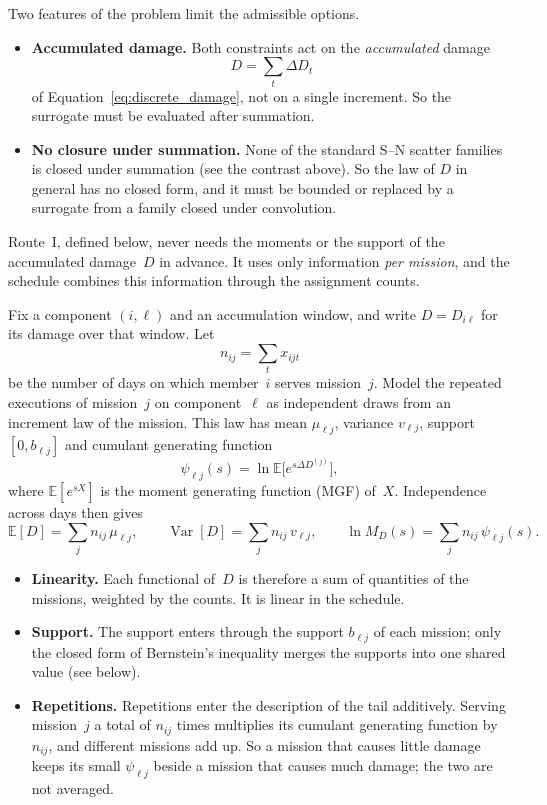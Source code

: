 \documentclass[11pt,a4paper]{article}
\theoremstyle{plain}
\theoremstyle{definition}
\theoremstyle{remark}
\begin{document}
Two features of the problem limit the admissible options.
\begin{itemize}
  \item \textbf{Accumulated damage.} Both constraints act on the \emph{accumulated} damage
    \begin{equation}
      D = \sum_t \Delta D_t
    \end{equation}
    of Equation~\eqref{eq:discrete_damage}, not on a single increment.
    So the surrogate must be evaluated after summation.
  \item \textbf{No closure under summation.} None of the standard S--N scatter families is closed under summation (see the contrast above).
    So the law of $D$ in general has no closed form, and it must be bounded or replaced by a surrogate from a family closed under convolution.
\end{itemize}

Route~I, defined below, never needs the moments or the support of the accumulated damage~$D$ in advance.
It uses only information \emph{per mission}, and the schedule combines this information through the assignment counts.

Fix a component $(i,\ell)$ and an accumulation window, and write $D = D_{i\ell}$ for its damage over that window.
Let
\begin{equation}
  n_{ij} = \sum_t x_{ijt}
\end{equation}
be the number of days on which member~$i$ serves mission~$j$.
Model the repeated executions of mission~$j$ on component~$\ell$ as independent draws from an increment law of the mission.
This law has mean $\mu_{\ell j}$, variance $v_{\ell j}$, support $[0,b_{\ell j}]$ and cumulant generating function
\begin{equation}
  \psi_{\ell j}(s) = \ln \mathbb{E}\big[e^{s\Delta D^{(j)}}\big],
\end{equation}
where $\mathbb{E}[e^{sX}]$ is the moment generating function (MGF) of~$X$.
Independence across days then gives
\begin{equation}\label{eq:additive_functionals}
  \mathbb{E}[D] = \sum_j n_{ij}\,\mu_{\ell j}, \qquad
  \operatorname{Var}[D] = \sum_j n_{ij}\,v_{\ell j}, \qquad
  \ln M_D(s) = \sum_j n_{ij}\,\psi_{\ell j}(s).
\end{equation}
\begin{itemize}
  \item \textbf{Linearity.} Each functional of~$D$ is therefore a sum of quantities of the missions, weighted by the counts.
    It is linear in the schedule.
  \item \textbf{Support.} The support enters through the support $b_{\ell j}$ of each mission; only the closed form of Bernstein's inequality merges the supports into one shared value (see below).
  \item \textbf{Repetitions.} Repetitions enter the description of the tail additively.
    Serving mission~$j$ a total of $n_{ij}$ times multiplies its cumulant generating function by $n_{ij}$, and different missions add up.
    So a mission that causes little damage keeps its small $\psi_{\ell j}$ beside a mission that causes much damage; the two are not averaged.
\end{itemize}
\end{document}
